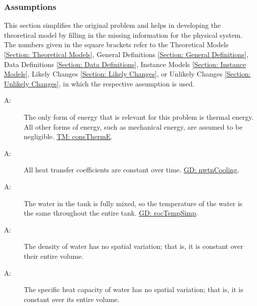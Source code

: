 \documentclass[12pt]{article}
\newcounter{assumpnum}
\newcommand{\atheassumpnum}{A\theassumpnum}
\begin{document}
\subsubsection{Assumptions}
\label{Sec:Assumps}
This section simplifies the original problem and helps in developing the theoretical model by filling in the missing information for the physical system. The numbers given in the square brackets refer to the Theoretical Models {[}\hyperref[Sec:TMs]{Section: Theoretical Models}{]}, General Definitions {[}\hyperref[Sec:GDs]{Section: General Definitions}{]}, Data Definitions {[}\hyperref[Sec:DDs]{Section: Data Definitions}{]}, Instance Models {[}\hyperref[Sec:IMs]{Section: Instance Models}{]}, Likely Changes {[}\hyperref[Sec:LCs]{Section: Likely Changes}{]}, or Unlikely Changes {[}\hyperref[Sec:UCs]{Section: Unlikely Changes}{]}, in which the respective assumption is used.
\begin{description}
\item[\atheassumpnum\label{A:Thermal-Energy-Only}:]The only form of energy that is relevant for this problem is thermal energy. All other forms of energy, such as mechanical energy, are assumed to be negligible. \hyperref[TM:consThermE]{TM: consThermE}.
\end{description}
\begin{description}
\item[\atheassumpnum\label{A:Heat-Transfer-Coeffs-Constant}:]All heat transfer coefficients are constant over time. \hyperref[GD:nwtnCooling]{GD: nwtnCooling}.
\end{description}
\begin{description}
\item[\atheassumpnum\label{A:Constant-Water-Temp-Across-Tank}:]The water in the tank is fully mixed, so the temperature of the water is the same throughout the entire tank. \hyperref[GD:rocTempSimp]{GD: rocTempSimp}.
\end{description}
\begin{description}
\item[\atheassumpnum\label{A:Density-Water-Constant-over-Volume}:]The density of water has no spatial variation; that is, it is constant over their entire volume.
\end{description}
\begin{description}
\item[\atheassumpnum\label{A:Specific-Heat-Energy-Constant-over-Volume}:]The specific heat capacity of water has no spatial variation; that is, it is constant over its entire volume.
\end{description}
\end{document}
